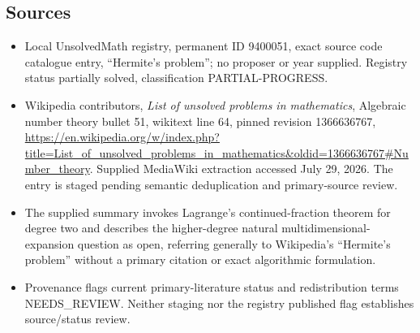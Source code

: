 \documentclass[11pt]{article}
\begin{document}
\subsection{Sources}
\begin{itemize}
\item Local UnsolvedMath registry, permanent ID 9400051, exact source code catalogue entry, ``Hermite's problem''; no proposer or year supplied. Registry status partially solved, classification PARTIAL-PROGRESS.
\item Wikipedia contributors, \emph{List of unsolved problems in mathematics}, Algebraic number theory bullet 51, wikitext line 64, pinned revision 1366636767, \url{https://en.wikipedia.org/w/index.php?title=List_of_unsolved_problems_in_mathematics&oldid=1366636767#Number_theory}. Supplied MediaWiki extraction accessed July 29, 2026. The entry is staged pending semantic deduplication and primary-source review.
\item The supplied summary invokes Lagrange's continued-fraction theorem for degree two and describes the higher-degree natural multidimensional-expansion question as open, referring generally to Wikipedia's ``Hermite's problem'' without a primary citation or exact algorithmic formulation.
\item Provenance flags current primary-literature status and redistribution terms NEEDS\_REVIEW. Neither staging nor the registry published flag establishes source/status review.
\end{itemize}
\end{document}

